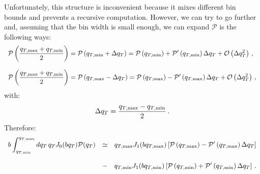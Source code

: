 \documentclass[10pt,a4paper]{article}
\begin{document}
Unfortunately, this structure is inconvenient because it mixes
different bin bounds and prevents a recursive computation.
However, we can try to go further and, assuming that the bin width is
small enough, we can expand $\mathcal{P}$ is the following ways:
\begin{equation}
\begin{array}{l}
\displaystyle\mathcal{P}\left(\frac{q_{T,\rm max}+q_{T,\rm
    min}}2\right)= \mathcal{P}\left(q_{T,\rm min}+\Delta q_T\right) =
  \mathcal{P}\left(q_{T,\rm min}\right) + \mathcal{P}'\left(q_{T,\rm
  min}\right)\Delta q_T +\mathcal{O}\left(\Delta q_T^2\right)\,,\\
\\
\displaystyle\mathcal{P}\left(\frac{q_{T,\rm max}+q_{T,\rm
    min}}2\right)= \mathcal{P}\left(q_{T,\rm max}-\Delta q_T\right) =
  \mathcal{P}\left(q_{T,\rm max}\right) - \mathcal{P}'\left(q_{T,\rm
  max}\right)\Delta q_T +\mathcal{O}\left(\Delta q_T^2\right)\,,
\end{array}
\end{equation}
with:
\begin{equation}\label{eq:halfqTinterval}
\Delta q_T = \frac{q_{T,\rm max}- q_{T,\rm min}}2\,.
\end{equation}
Therefore:
\begin{equation}\label{eq:lastexpP}
\begin{array}{rcl}
  \displaystyle  b\int_{q_{T,\rm min}}^{q_{T,\rm
  max}} dq_T\, q_T J_0(bq_T) \mathcal{P}(q_T)&\simeq&\displaystyle
                                                      q_{T,\rm
                                                      max}
                                                      J_1(bq_{T,\rm
                                                      max})\left[
                                                      \mathcal{P}\left(q_{T,\rm
                                                      max}\right)
                                                      - 
                                                      \mathcal{P}'\left(q_{T,\rm
                                                      max}\right)\Delta
                                                      q_T\right]\\
\\
&-&\displaystyle q_{T,\rm
                                                      min}
                                                      J_1(bq_{T,\rm
                                                      min})\left[
                                                      \mathcal{P}\left(q_{T,\rm
                                                      min}\right)
                                                      +
                                                      \mathcal{P}'\left(q_{T,\rm
                                                      min}\right)\Delta
                                                      q_T\right]\,.
\end{array}
\end{equation}
\end{document}
